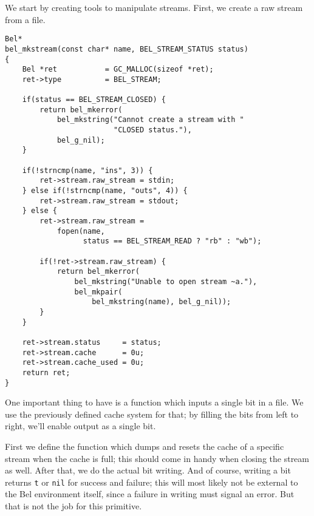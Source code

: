 \documentclass[openright,a4paper,twoside,12pt]{memoir}
\begin{document}
We start by creating tools to manipulate streams. First, we create a
raw stream from a file.

\begin{verbatim}
Bel*
bel_mkstream(const char* name, BEL_STREAM_STATUS status)
{
    Bel *ret           = GC_MALLOC(sizeof *ret);
    ret->type          = BEL_STREAM;

    if(status == BEL_STREAM_CLOSED) {
        return bel_mkerror(
            bel_mkstring("Cannot create a stream with "
                         "CLOSED status."),
            bel_g_nil);
    }

    if(!strncmp(name, "ins", 3)) {
        ret->stream.raw_stream = stdin;
    } else if(!strncmp(name, "outs", 4)) {
        ret->stream.raw_stream = stdout;
    } else {
        ret->stream.raw_stream =
            fopen(name,
                  status == BEL_STREAM_READ ? "rb" : "wb");
        
        if(!ret->stream.raw_stream) {
            return bel_mkerror(
                bel_mkstring("Unable to open stream ~a."),
                bel_mkpair(
                    bel_mkstring(name), bel_g_nil));
        }
    }

    ret->stream.status     = status;
    ret->stream.cache      = 0u;
    ret->stream.cache_used = 0u;
    return ret;
}
\end{verbatim}

One important thing to have is a function which inputs a single bit in
a file. We use the previously defined cache system for that; by
filling the bits from left to right, we'll enable output as a single
bit.

First we define the function which dumps and resets the cache of a
specific stream when the cache is full; this should come in handy when
closing the stream as well. After that, we do the actual bit
writing. And of course, writing a bit returns \texttt{t} or \texttt{nil} for success and
failure; this will most likely not be external to the Bel environment
itself, since a failure in writing must signal an error. But that is
not the job for this primitive.
\end{document}
